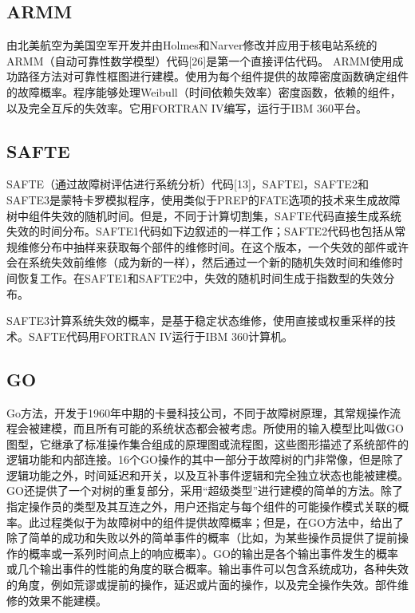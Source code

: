 \documentclass[cn,11pt,chinese]{elegantbook}
\begin{document}
{\subsection{ARMM}

由北美航空为美国空军开发并由Holmes和Narver修改并应用于核电站系统的ARMM（自动可靠性数学模型）代码[26]是第一个直接评估代码。 ARMM使用成功路径方法对可靠性框图进行建模。使用为每个组件提供的故障密度函数确定组件的故障概率。程序能够处理Weibull（时间依赖失效率）密度函数，依赖的组件，以及完全互斥的失效率。它用FORTRAN IV编写，运行于IBM 360平台。

\subsection{SAFTE}

SAFTE（通过故障树评估进行系统分析）代码[13]，SAFTEl，SAFTE2和SAFTE3是蒙特卡罗模拟程序，使用类似于PREP的FATE选项的技术来生成故障树中组件失效的随机时间。但是，不同于计算切割集，SAFTE代码直接生成系统失效的时间分布。SAFTE1代码如下边叙述的一样工作；SAFTE2代码也包括从常规维修分布中抽样来获取每个部件的维修时间。在这个版本，一个失效的部件或许会在系统失效前维修（成为新的一样），然后通过一个新的随机失效时间和维修时间恢复工作。在SAFTE1和SAFTE2中，失效的随机时间生成于指数型的失效分布。

SAFTE3计算系统失效的概率，是基于稳定状态维修，使用直接或权重采样的技术。SAFTE代码用FORTRAN IV运行于IBM 360计算机。

\subsection{GO}\label{ss12-4-3}

Go方法，开发于1960年中期的卡曼科技公司，不同于故障树原理，其常规操作流程会被建模，而且所有可能的系统状态都会被考虑。所使用的输入模型比叫做GO图型，它继承了标准操作集合组成的原理图或流程图，这些图形描述了系统部件的逻辑功能和内部连接。16个GO操作的其中一部分于故障树的门非常像，但是除了逻辑功能之外，时间延迟和开关，以及互补事件逻辑和完全独立状态也能被建模。GO还提供了一个对树的重复部分，采用“超级类型”进行建模的简单的方法。除了指定操作员的类型及其互连之外，用户还指定与每个组件的可能操作模式关联的概率。此过程类似于为故障树中的组件提供故障概率；但是，在GO方法中，给出了除了简单的成功和失败以外的简单事件的概率（比如，为某些操作员提供了提前操作的概率或一系列时间点上的响应概率）。GO的输出是各个输出事件发生的概率或几个输出事件的性能的角度的联合概率。输出事件可以包含系统成功，各种失效的角度，例如荒谬或提前的操作，延迟或片面的操作，以及完全操作失效。部件维修的效果不能建模。

}
\end{document}

